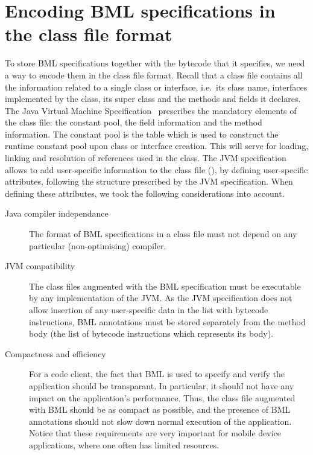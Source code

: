 \section{Encoding BML specifications in the class file format}
\label{SecClassfile}

To store BML specifications together with the bytecode that it
specifies, we need a way to encode them in the class file
format. Recall that a class file contains all the information related
to a single class or interface, i.e.\ its class name, interfaces
implemented by the class, its super class and the methods and fields
it declares. The Java Virtual Machine Specification~\cite{JVMspec}
prescribes the mandatory elements of the class file: the constant
pool, the field information and the method information. The constant
pool is the table which is used to construct the runtime constant pool
upon class or interface creation. This will serve for loading, linking
and resolution of references used in the class. The JVM specification
allows to add user-specific information to the class file
(\cite[\S4.7.1]{JVMspec}), by defining user-specific attributes,
following the structure prescribed by the JVM specification. When
defining these attributes, we took the following considerations into
account.

\begin{description}
\item [Java compiler independance]
The format of BML specifications in a class file must not depend on
any particular (non-optimising) compiler.
    
      
\item [JVM compatibility]
The class files augmented with the BML specification must be
executable by any implementation of the JVM.  As the JVM specification
does not allow insertion of any user-specific data in the list with
bytecode instructions, BML annotations must be stored separately from
the method body (the list of bytecode instructions which represents
its body).

\item[Compactness and efficiency]
For a code client, the fact that BML is used to specify and verify the
application should be transparant. In particular, it should not have
any impact on the application's performance. Thus, the class file
augmented with BML should be as compact as possible, and the presence
of BML annotations should not slow down normal execution of the
application. Notice that these requirements are very important for
mobile device applications, where one often has limited resources.
\end{description}	  

